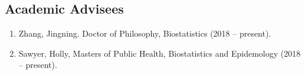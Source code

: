 \documentclass[10pt]{article}
\newcommand{\myben}[1]{\smallskip\begin{enumerate}[start=1,label={\scriptsize \arabic*$\ $},leftmargin=\parindent]\setlength{\itemsep}{#1}\vspace*{-0.7em}}
\newcommand{\ee}{\end{enumerate}}
\newcommand{\mylift}[1]{\vspace*{#1}}
\begin{document}
\smallskip






\subsection*{Academic Advisees}

\myben{-0.1em}

\item Zhang, Jingning. Doctor of Philosophy, Biostatistics (2018 -- present).
\item Sawyer, Holly, Masters of Public Health, Biostatistics and Epidemology (2018 -- present).

\ee











\mylift{-1.5em}
\end{document}
